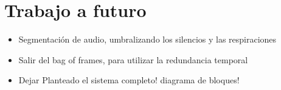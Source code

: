 \documentclass{article}
\begin{document}
\section{Trabajo a futuro}

\begin{itemize} 
  \item Segmentación de audio, umbralizando los silencios y las respiraciones 
  \item Salir del bag of frames, para utilizar la redundancia temporal
  \item Dejar Planteado el sistema completo! diagrama de bloques!
\end{itemize}


\newpage




\end{document}

